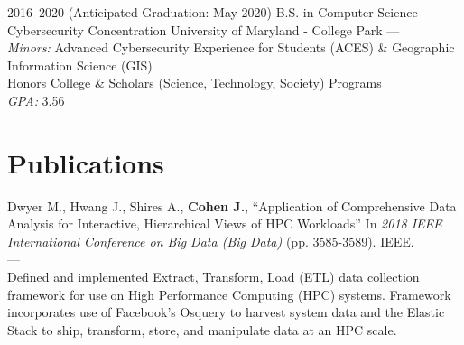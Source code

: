 \documentclass[print]{friggeri-cv} %
\begin{document}
\begin{entrylist}


\entry
{2016--2020 (Anticipated Graduation: May 2020)}
{B.S. in Computer Science - Cybersecurity Concentration} %
{University of Maryland - College Park}
{---\\ \emph{Minors:} Advanced Cybersecurity Experience for Students (ACES) \& Geographic Information Science (GIS) \\ Honors College \& Scholars (Science, Technology, Society) Programs \\ \emph{GPA: } 3.56}



\end{entrylist}









\section{Publications}

Dwyer M., Hwang J., Shires A., \textbf{Cohen J.}, “Application of Comprehensive Data Analysis for Interactive, Hierarchical Views of HPC Workloads” In \textit{2018 IEEE International Conference on Big Data (Big Data)} (pp. 3585-3589). IEEE. \\ --- \\
Defined and implemented Extract, Transform, Load (ETL) data collection framework for use on High Performance Computing (HPC) systems. Framework incorporates use of Facebook’s Osquery to harvest system data and the Elastic Stack to ship, transform, store, and manipulate data at an HPC scale.
\end{document}
